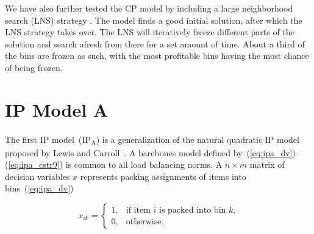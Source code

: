 \documentclass{llncs}
\begin{document}
We have also further tested the CP model by including a large neighborhood search (LNS) strategy \cite{Shaw1998}. The model finds a good initial solution, after which the LNS strategy takes over. The LNS will iteratively freeze different parts of the solution and search afresh from there for a set amount of time. About a third of the bins are frozen as such, with the most profitable bins having the most chance of being frozen.




\section{IP Model A}
\label{sec:ip_model_a}

%

\paragraph{}The first IP model~(IP\textsubscript{A}) is a generalization of the natural quadratic IP model proposed by Lewis and Carroll~\cite{Lewis2016}. A barebones model defined by~(\ref{eq:ipa_dv})--(\ref{eq:ipa_cstr9}) is common to all load balancing norms. A $n \times m$ matrix of decision variables $x$ represents packing assignments of items into bins~(\ref{eq:ipa_dv})

\begin{equation}
  x_{ik}=
  \begin{cases}
    \label{eq:ipa_dv}
    1, & \mbox{if item $i$ is packed into bin $k$,} \\
    0, & \mbox{otherwise.}
  \end{cases}
\end{equation}
\end{document}
